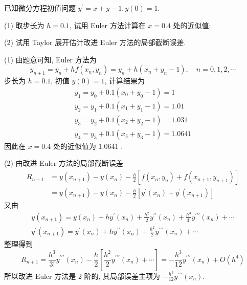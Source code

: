     \begin{tcolorbox}[enhanced,colback=8,colframe=7,breakable,coltitle=green!25!black,title=2024]
 已知微分方程初值问题 $ y^{\prime}=x+y-1, y(0)=1 $.
 
(1) 取步长为 $ h=0.1 $, 试用 Euler 方法计算在 $ x=0.4 $ 处的近似值;

(2) 试用 Taylor 展开估计改进 Euler 方法的局部截断误差.
 \tcblower

 (1) 由题意可知, Euler 方法为
$$
y_{n+1}=y_{n}+h f\left(x_{n}, y_{n}\right)=y_{n}+h\left(x_{n}+y_{n}-1\right), \quad n=0,1,2, \cdots
$$
步长为 $ h=0.1 $, 初值 $ y(0)=1 $, 计算结果为
$$
\begin{array}{l}
y_{1}=y_{0}+0.1\left(x_{0}+y_{0}-1\right)=1 \\
y_{2}=y_{1}+0.1\left(x_{1}+y_{1}-1\right)=1.01 \\
y_{3}=y_{2}+0.1\left(x_{2}+y_{2}-1\right)=1.031 \\
y_{4}=y_{3}+0.1\left(x_{3}+y_{3}-1\right)=1.0641
\end{array}
$$
因此在 $ x=0.4 $ 处的近似值为 1.0641 .


(2) 由改进 Euler 方法的局部截断误差
$$
\begin{aligned}
R_{n+1} & =y\left(x_{n+1}\right)-y\left(x_{n}\right)-\frac{h}{2}\left[f\left(x_{n}, y_{n}\right)+f\left(x_{n+1}, y_{n+1}\right)\right] \\
& =y\left(x_{n+1}\right)-y\left(x_{n}\right)-\frac{h}{2}\left[y^{\prime}\left(x_{n}\right)+y^{\prime}\left(x_{n+1}\right)\right]
\end{aligned}
$$
又由
$$
\begin{array}{l}
y\left(x_{n+1}\right)=y\left(x_{n}\right)+h y^{\prime}\left(x_{n}\right)+\frac{h^{2}}{2} y^{\prime \prime}\left(x_{n}\right)+\frac{h^{3}}{3!} y^{\prime \prime \prime}\left(x_{n}\right)+\cdots \\
y^{\prime}\left(x_{n+1}\right)=y^{\prime}\left(x_{n}\right)+h y^{\prime \prime}\left(x_{n}\right)+\frac{h^{2}}{2} y^{\prime \prime \prime}\left(x_{n}\right)+\cdots
\end{array}
$$
整理得到
$$
R_{n+1}=\frac{h^{3}}{3!} y^{\prime \prime \prime}\left(x_{n}\right)-\frac{h}{2}\left[\frac{h^{2}}{2} y^{\prime \prime \prime}\left(x_{n}\right)+\cdots\right]=-\frac{h^{3}}{12} y^{\prime \prime \prime}\left(x_{n}\right)+O\left(h^{4}\right)
$$
所以改进 Euler 方法是 2 阶的, 其局部误差主项为 $ -\frac{h^{3}}{12} y^{\prime \prime \prime}\left(x_{n}\right) $.
 \end{tcolorbox}


